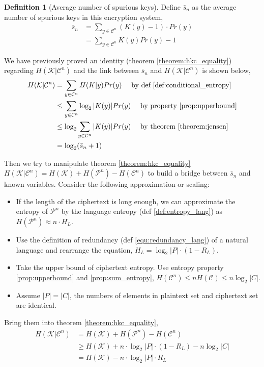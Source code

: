\documentclass[letterpaper, 10 pt, conference]{ieeeconf}  %
\theoremstyle{definition}
\newtheorem{definition}{Definition}[section]
\theoremstyle{property}
\begin{document}
\begin{definition}[Average number of spurious keys]
\label{def:s_n}
Define $\bar s_n$ as the average number of spurious keys in this encryption system,
\begin{align*}
    \bar s_n &= \sum_{y\in \mathcal{C}^n} (K(y)-1)\cdot Pr(y) \\
    &= \sum_{y\in \mathcal{C}^n} K(y)Pr(y)-1
\end{align*}
\end{definition}

We have previously proved an identity (theorem \ref{theorem:hkc_equality}) regarding $H(\mathcal{K}\vert \mathcal{C}^n)$ and the link between $\bar s_n$ and $H(\mathcal{K}\vert \mathcal{C}^n)$ is shown below,
\begin{align*}
    H(\mathcal{K}\vert \mathcal{C}^n) &= \sum_{y\in \mathcal{C}^n} H(K|y)Pr(y)~~~~\hbox{by def \ref{def:conditional_entropy}} \\
    &\leq \sum_{y\in \mathcal{C}^n} \log_2|K(y)|Pr(y)~~~~\hbox{by property \ref{prop:upperbound}} \\
    &\leq \log_2\sum_{y\in \mathcal{C}^n} |K(y)|Pr(y)~~~~\hbox{by theorem \ref{theorem:jensen}} \\
    &= \log_2 (\bar s_n + 1)
\end{align*}

Then we try to manipulate theorem \ref{theorem:hkc_equality} $H(\mathcal{K}\vert \mathcal{C}^n) = H(\mathcal{K})+H(\mathcal{P}^n) - H(\mathcal{C}^n)$ to build a bridge between $\bar s_n$ and known variables. Consider the following approximation or scaling:
\begin{itemize}
    \item If the length of the ciphertext is long enough, we can approximate the entropy of $\mathcal{P}^n$ by the language entropy (def \ref{def:entropy_lang}) as $H(\mathcal{P}^n)\approx n\cdot H_L$.
    \item Use the definition of redundancy (def \ref{equ:redundancy_lang}) of a natural language and rearrange the equation, $H_L=\log_2|P|\cdot (1-R_L)$.
    \item Take the upper bound of ciphertext entropy. Use entropy property \ref{prop:upperbound} and \ref{prop:sum_entropy}, $H(\mathcal{C}^n)\leq n H(\mathcal{C})\leq n\log_2|C|$.
    \item Assume $|P|=|C|$, the numbers of elements in plaintext set and ciphertext set are identical. 
\end{itemize}{}

Bring them into theorem \ref{theorem:hkc_equality}, 
\begin{align*}
    H(\mathcal{K}\vert \mathcal{C}^n) &= H(\mathcal{K})+H(\mathcal{P}^n) - H(\mathcal{C}^n) \\
    &\geq H(\mathcal{K})+n\cdot \log_2|P|\cdot (1-R_L)-n\log_2|C| \\
    &= H(\mathcal{K}) - n\cdot \log_2|P|\cdot  R_L
\end{align*}
\end{document}
